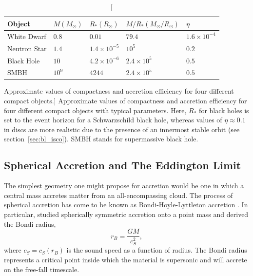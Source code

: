 \begin{table}
\centering
\begin{tabular}{p{4cm}p{2cm}p{2cm}p{3cm}p{2cm}}
\hline 
Object & $M (M_\odot)$ & $R_* (R_\odot)$ & $M/R_* (M_\odot / R_\odot)$ & $\eta$ \\ 
\hline \hline 
White Dwarf & $0.8$ & $0.01$ & $79.4$ & $1.6\times10^{-4}$ \\
Neutron Star & $1.4$ & $1.4\times10^{-5}$ & $10^5$ & $0.2$ \\
Black Hole & $10$ & $4.2\times10^{-6}$ & $2.4\times10^5$ & $0.5$ \\
SMBH & $10^9$ & $4244$ & $2.4\times10^5$ & $0.5$ \\
\hline
\end{tabular}
\centering
\caption
[Approximate values of compactness and accretion efficiency
for four different compact objects.]
{
Approximate values of compactness and accretion efficiency 
for four different compact objects with typical
parameters. Here, $R_*$ for black holes is set to the event horizon
for a Schwarzschild black hole, whereas values of $\eta \approx 0.1$ in discs 
are more realistic due to the presence of an innermost stable 
orbit (see section~\ref{sec:bl_isco}). 
SMBH stands for supermassive black hole.
}
\label{compact}
\end{table}

\subsection{Spherical Accretion and The Eddington Limit}
\label{sec:eddington}

The simplest geometry one might propose for accretion
would be one in which a central mass accretes matter 
from an all-encompassing cloud.
The process of spherical accretion has come to be known as 
Bondi-Hoyle-Lyttleton accretion \citep{hoyle1939,bondi1944}.
In particular, \cite{bondi1952} studied spherically symmetric 
accretion onto a point mass and derived the Bondi radius,
\begin{equation}
r_B = \frac{G M}{c_S^2},
\label{eq:bondi}
\end{equation} 
where $c_S = c_S(r_B)$ is the sound speed as a function of radius.
The Bondi radius represents a critical point inside which the material
is supersonic and will accrete on the free-fall timescale.

